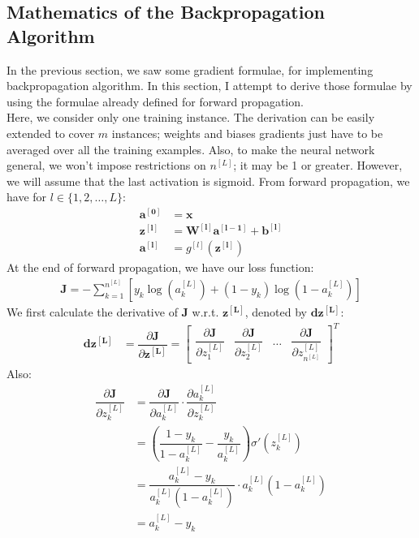\documentclass[a4paper, 12pt]{article}
\begin{document}
\subsection{Mathematics of the Backpropagation Algorithm}
In the previous section, we saw some gradient formulae, for implementing backpropagation algorithm. In this section, I attempt to derive those formulae by using the formulae already defined for forward propagation. \\
\break
Here, we consider only one training instance. The derivation can be easily extended to cover $m$ instances; weights and biases gradients just have to be averaged over all the training examples. Also, to make the neural network general, we won't impose restrictions on $n^{[L]}$; it may be 1 or greater. However, we will assume that the last activation is sigmoid. From forward propagation, we have for $l \in \{1, 2, \dots, L\}$:
\begin{align*}
\bm{a^{\left[0\right]}} &= \bm{x} \\
\bm{z^{\left[l\right]}} &= \bm{W^{\left[l\right]}}\bm{a^{\left[l-1\right]}} + \bm{b^{\left[l\right]}} \\
\bm{a^{\left[l\right]}} &= g^{[l]}\left(\bm{z^{\left[l\right]}}\right)
\end{align*}
At the end of forward propagation, we have our loss function:
\begin{align*}
\bm{J} = -\sum_{k=1}^{n^{[L]}}\left[y_{k}\log\left(a_{k}^{[L]}\right) + \left(1-y_{k}\right)\log\left(1-a_{k}^{[L]}\right)\right]
\end{align*}
We first calculate the derivative of $\bm{J}$ w.r.t. $\bm{z^{\left[L\right]}}$, denoted by $\bm{dz^{\left[L\right]}}$:
\begin{align*}
\bm{dz^{\left[L\right]}} &= \dfrac{\partial \bm{J}}{\partial \bm{z^{\left[L\right]}}} = 
\begin{bmatrix}
\dfrac{\partial \bm{J}}{\partial z_{1}^{\left[L\right]}} &
\dfrac{\partial \bm{J}}{\partial z_{2}^{\left[L\right]}} &
\dots &
\dfrac{\partial \bm{J}}{\partial z_{n^{[L]}}^{\left[L\right]}}
\end{bmatrix}^T
\end{align*}
Also:
\begin{align*}
\dfrac{\partial \bm{J}}{\partial z_k^{\left[L\right]}} &= \dfrac{\partial \bm{J}}{\partial a_{k}^{\left[L\right]}}\cdot\dfrac{\partial a_{k}^{\left[L\right]}}{\partial z_{k}^{\left[L\right]}} \\
&= \left(\dfrac{1-y_{k}}{1-a_{k}^{[L]}} - \dfrac{y_{k}}{a_{k}^{[L]}}\right)\sigma'\left(z_{k}^{\left[L\right]}\right) \\
&= \dfrac{a_k^{[L]} - y_k}{a_k^{[L]}\left(1-a_k^{[L]}\right)}\cdot a_k^{[L]}\left(1-a_k^{[L]}\right) \\
&= a_k^{[L]} - y_k
\end{align*}
\end{document}
